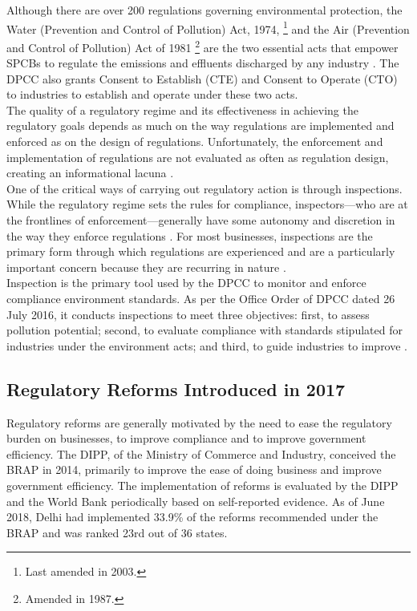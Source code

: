 \documentclass[a4paper, 12pt]{article}
\begin{document}
                 Although there are over 200 regulations governing environmental protection, the Water (Prevention and Control of Pollution) Act, 1974, \footnote{Last amended in 2003.} and the Air (Prevention and Control of Pollution) Act of 1981 \footnote{Amended in 1987.} are the two essential acts that empower SPCBs to regulate the emissions and effluents discharged by any industry \parencite{OECD06}. The DPCC also grants Consent to Establish (CTE) and Consent to Operate (CTO) to industries to establish and operate under these two acts. \\
                 
                 The quality of a regulatory regime and its effectiveness in achieving the regulatory goals depends as much on the way regulations are implemented and enforced as on the design of regulations. Unfortunately, the enforcement and implementation of regulations are not evaluated as often as regulation design, creating an informational lacuna \parencite{OECD14}. \\
                 
                 One of the critical ways of carrying out regulatory action is through inspections. While the regulatory regime sets the rules for compliance, inspectors—who are at the frontlines of enforcement—generally have some autonomy and discretion in the way they enforce regulations \parencite{May2003}. For most businesses, inspections are the primary form through which regulations are experienced and are a particularly important concern because they are recurring in nature \parencite{blancflorentin}. \\
                 
                 Inspection is the primary tool used by the DPCC to monitor and enforce compliance environment standards. As per the Office Order of DPCC dated 26 July 2016, it conducts inspections to meet three objectives: first, to assess pollution potential; second, to evaluate compliance with standards stipulated for industries under the environment acts; and third, to guide industries to improve \parencite{DPCCb}. 
                 
                 \subsection{Regulatory Reforms Introduced in 2017}
                 
                 Regulatory reforms are generally motivated by the need to ease the regulatory burden on businesses, to improve compliance and to improve government efficiency. The DIPP, of the Ministry of Commerce and Industry, conceived the BRAP in 2014, primarily to improve the ease of doing business and improve government efficiency. The implementation of reforms is evaluated by the DIPP and the World Bank periodically based on self-reported evidence. As of June 2018, Delhi had implemented 33.9\% of the reforms recommended under the BRAP and was ranked 23rd out of 36 states. \\
                 
\end{document}
